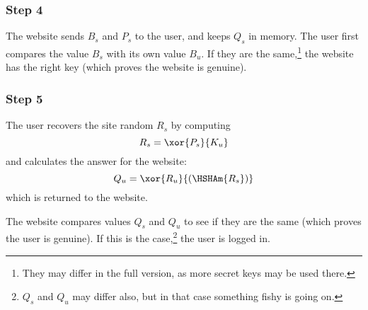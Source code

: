 \subsubsection{Step 4}
The website sends $B_s$ and $P_s$ to the user, and keeps $Q_s$ in memory.
The user first compares the value $B_s$ with its own value $B_u$.
If they are the same,\footnote{They may differ in the full version, as more secret keys may be used there.}
the website has the right key
(which proves the website is genuine).
\subsubsection{Step 5}
The user recovers the site random $R_s$ by computing
\[R_s=\xor{P_s}{K_u}\]
and calculates the answer for the website:
\[Q_u=\xor{R_u}{(\HSHAm{R_s})}\]
which is returned to the website.
\par
The website compares values $Q_s$ and $Q_u$ to see if they are the same
(which proves the user is genuine).
If this is the case,\footnote{$Q_s$ and $Q_u$ may differ also, but in that case something fishy is going on.}
the user is logged in.
